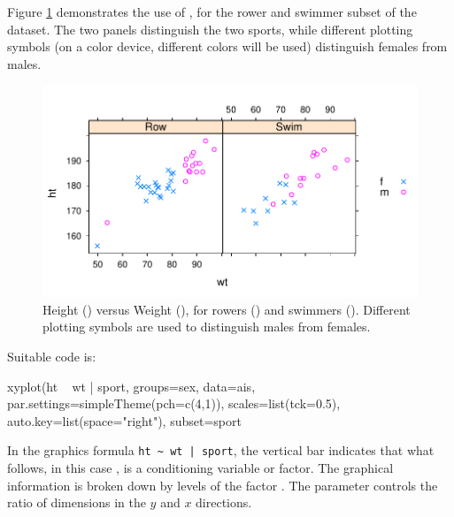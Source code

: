 Figure \ref{fig:lattice-ais} demonstrates the use of ,
for the rower and swimmer subset of the  dataset.  The two
panels distinguish the two sports, while different plotting symbols
(on a color device, different colors will be used) distinguish females
from males.
\begin{figure}[h]
\begin{Schunk}


\centerline{\includegraphics[width=\textwidth]{figs/07-rowSwim-1} }

\end{Schunk}
      \caption{Height () versus Weight (), for
        rowers () and swimmers ().
        Different plotting symbols are used to distinguish males from
        females.}\label{fig:lattice-ais}
\end{figure}

\noindent
Suitable code is:
\begin{Schunk}
\begin{Sinput}
xyplot(ht ~ wt | sport, groups=sex, data=ais,
       par.settings=simpleTheme(pch=c(4,1)),
       scales=list(tck=0.5),
       auto.key=list(space="right"),
       subset=sport%
\end{Sinput}
\end{Schunk}

In the graphics formula \verb!ht ~ wt | sport!, 
the vertical bar indicates that what follows, in this case
, is a conditioning variable or factor.  The
graphical information is broken down by levels of the factor
.  The parameter  controls the ratio
of dimensions in the $y$ and $x$ directions.

